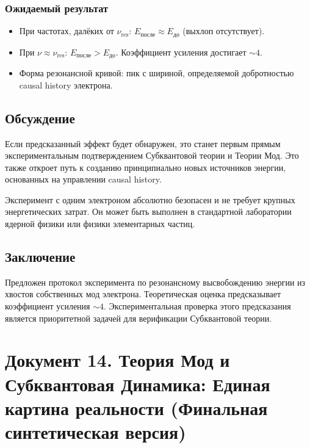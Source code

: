 \documentclass[12pt,a4paper]{article}
\begin{document}
\subsubsection{Ожидаемый результат}
\begin{itemize}
    \item При частотах, далёких от $\nu_{\text{res}}$: $E_{\text{после}} \approx E_{\text{до}}$ (выхлоп отсутствует).
    \item При $\nu \approx \nu_{\text{res}}$: $E_{\text{после}} > E_{\text{до}}$. Коэффициент усиления достигает $\sim 4$.
    \item Форма резонансной кривой: пик с шириной, определяемой добротностью causal history электрона.
\end{itemize}

\subsection{Обсуждение}
Если предсказанный эффект будет обнаружен, это станет первым прямым экспериментальным подтверждением Субквантовой теории и Теории Мод. Это также откроет путь к созданию принципиально новых источников энергии, основанных на управлении causal history.

Эксперимент с одним электроном абсолютно безопасен и не требует крупных энергетических затрат. Он может быть выполнен в стандартной лаборатории ядерной физики или физики элементарных частиц.

\subsection{Заключение}
Предложен протокол эксперимента по резонансному высвобождению энергии из хвостов собственных мод электрона. Теоретическая оценка предсказывает коэффициент усиления $\sim 4$. Экспериментальная проверка этого предсказания является приоритетной задачей для верификации Субквантовой теории.


\newpage
\section*{Документ 14. Теория Мод и Субквантовая Динамика: Единая картина реальности (Финальная синтетическая версия)}
\end{document}
